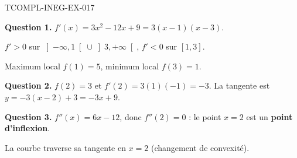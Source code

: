 \begin{corrige}{TCOMPL-INEG-EX-017}

\textbf{Question 1.} $f'(x) = 3x^2 - 12x + 9 = 3(x-1)(x-3)$.


$f' > 0$ sur $\left]-\infty,1\right[ \cup \left]3,+\infty\right[$, $f' < 0$ sur $[1,3]$.

Maximum local $f(1) = 5$, minimum local $f(3) = 1$.

\textbf{Question 2.} $f(2) = 3$ et $f'(2) = 3(1)(-1) = -3$. La tangente est $y = -3(x-2)+3 = -3x+9$.

\textbf{Question 3.} $f''(x) = 6x - 12$, donc $f''(2) = 0$ : le point $x=2$ est un \textbf{point d'inflexion}.

La courbe traverse sa tangente en $x = 2$ (changement de convexité).

\end{corrige}
